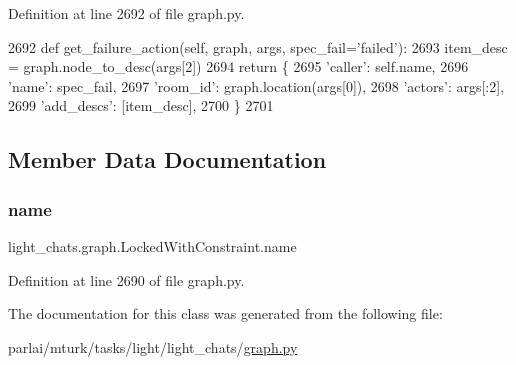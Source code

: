 Definition at line 2692 of file graph.\+py.


\begin{DoxyCode}
2692     \textcolor{keyword}{def }get\_failure\_action(self, graph, args, spec\_fail='failed'):
2693         item\_desc = graph.node\_to\_desc(args[2])
2694         \textcolor{keywordflow}{return} \{
2695             \textcolor{stringliteral}{'caller'}: self.name,
2696             \textcolor{stringliteral}{'name'}: spec\_fail,
2697             \textcolor{stringliteral}{'room\_id'}: graph.location(args[0]),
2698             \textcolor{stringliteral}{'actors'}: args[:2],
2699             \textcolor{stringliteral}{'add\_descs'}: [item\_desc],
2700         \}
2701 
\end{DoxyCode}


\subsection{Member Data Documentation}
\mbox{\label{classlight__chats_1_1graph_1_1LockedWithConstraint_ab4ccf9bea5ce492ae5095b06719cf812}} 
\subsubsection{\texorpdfstring{name}{name}}
{\footnotesize\ttfamily light\+\_\+chats.\+graph.\+Locked\+With\+Constraint.\+name\hspace{0.3cm}{\ttfamily [static]}}



Definition at line 2690 of file graph.\+py.



The documentation for this class was generated from the following file\+:\begin{DoxyCompactItemize}
\item 
parlai/mturk/tasks/light/light\+\_\+chats/\hyperlink{parlai_2mturk_2tasks_2light_2light__chats_2graph_8py}{graph.\+py}\end{DoxyCompactItemize}

